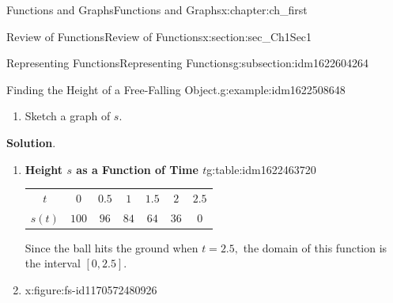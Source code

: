 \documentclass[oneside,10pt,]{book}
\newcommand{\blocktitlefont}{\relax}
\newcommand{\tabularfont}{\relax}
\numberwithin{equation}{section}
\begin{document}
\begin{chapterptx}{Functions and Graphs}{}{Functions and Graphs}{}{}{x:chapter:ch_first}
\begin{sectionptx}{Review of Functions}{}{Review of Functions}{}{}{x:section:sec_Ch1Sec1}
\begin{subsectionptx}{Representing Functions}{}{Representing Functions}{}{}{g:subsection:idm1622604264}
\begin{example}{Finding the Height of a Free-Falling Object.}{g:example:idm1622508648}
\begin{enumerate}
\item{}Sketch a graph of \(s.\)%
\end{enumerate}
\par\smallskip%
\noindent\textbf{\blocktitlefont Solution}.\hypertarget{g:solution:idm1622462824}{}\quad{}%
\begin{enumerate}
\item{}\begin{tableptx}{\textbf{Height \(s\) as a Function of Time \(t\)}}{g:table:idm1622463720}{}%
\centering%
{\tabularfont%
\begin{tabular}{lllllll}
\multicolumn{1}{c}{\(t\)}&\multicolumn{1}{c}{\(0\)}&\multicolumn{1}{c}{\(0.5\)}&\multicolumn{1}{c}{\(1\)}&\multicolumn{1}{c}{\(1.5\)}&\multicolumn{1}{c}{\(2\)}&\multicolumn{1}{c}{\(2.5\)}\tabularnewline[0pt]
\multicolumn{1}{c}{\(s(t)\)}&\multicolumn{1}{c}{\(100\)}&\multicolumn{1}{c}{\(96\)}&\multicolumn{1}{c}{\(84\)}&\multicolumn{1}{c}{\(64\)}&\multicolumn{1}{c}{\(36\)}&\multicolumn{1}{c}{\(0\)}
\end{tabular}
}%
\end{tableptx}%
%
\par
Since the ball hits the ground when \(t=2.5,\) the domain of this function is the interval \([0,2.5].\)%
\item{}\begin{figureptx}{}{x:figure:fs-id1170572480926}{}%
\begin{image}{0.25}{0.5}{0.25}%

\end{image}
\end{figureptx}
\end{enumerate}
\end{example}
\end{subsectionptx}
\end{sectionptx}
\end{chapterptx}
\end{document}
